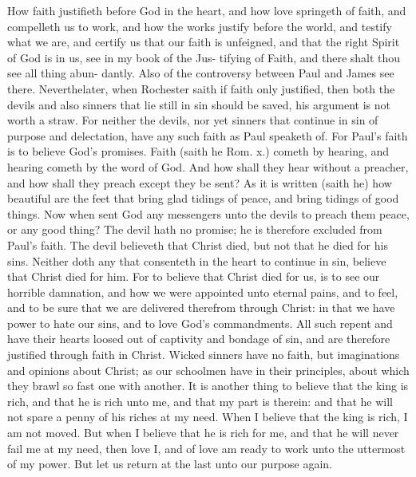 \documentclass{custom}
\begin{document}
How faith justifieth before God in the heart, and how 
love springeth of faith, and compelleth us to work, and 
how the works justify before the world, and testify what 
we are, and certify us that our faith is unfeigned, and that 
the right Spirit of God is in us, see in my book of the Jus- 
tifying of Faith, and there shalt thou see all thing abun- 
dantly. Also of the controversy between Paul and 
James see there. Neverthelater, when Rochester saith 
if faith only justified, then both the devils and also 
sinners that lie still in sin should be saved, his argument is 
not worth a straw. For neither the devils, nor yet sinners 
that continue in sin of purpose and delectation, have any 
such faith as Paul speaketh of. For Paul's faith is to 
believe God's promises. Faith (saith he Rom. x.) cometh 
by hearing, and hearing cometh by the word of God. 
And how shall they hear without a preacher, and how shall 
they preach except they be sent? As it is written (saith 
he) how beautiful are the feet that bring glad tidings of 
peace, and bring tidings of good things. Now when 
sent God any messengers unto the devils to preach them 
peace, or any good thing? The devil hath no promise; 
he is therefore excluded from Paul's faith. The devil 
believeth that Christ died, but not that he died for his sins. 
Neither doth any that consenteth in the heart to continue 
in sin, believe that Christ died for him. For to believe 
that Christ died for us, is to see our horrible damnation, 
and how we were appointed unto eternal pains, and to feel, 
and to be sure that we are delivered therefrom through 
Christ: in that we have power to hate our sins, and to 
love God's commandments. All such repent and have 
their hearts loosed out of captivity and bondage of sin, 
and are therefore justified through faith in Christ. Wicked 
sinners have no faith, but imaginations and opinions about 
Christ; as our schoolmen have in their principles, about 
which they brawl so fast one with another. It is another 
thing to believe that the king is rich, and that he is rich 
unto me, and that my part is therein: and that he will not 
spare a penny of his riches at my need. When I believe that 
the king is rich, I am not moved. But when I believe 
that he is rich for me, and that he will never fail me at my 
need, then love I, and of love am ready to work unto the 
uttermost of my power. But let us return at the last 
unto our purpose again. 
\end{document}
